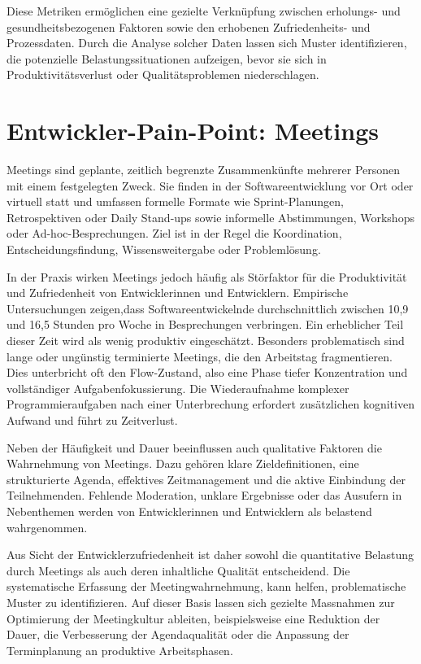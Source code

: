 \documentclass[12pt,a4paper]{report}
\begin{document}
Diese Metriken ermöglichen eine gezielte Verknüpfung zwischen erholungs- und gesundheitsbezogenen Faktoren sowie den erhobenen
Zufriedenheits- und Prozessdaten. Durch die Analyse solcher Daten lassen sich Muster identifizieren, die potenzielle
Belastungssituationen aufzeigen, bevor sie sich in Produktivitätsverlust oder Qualitätsproblemen niederschlagen. 


\section{Entwickler-Pain-Point: Meetings}

    Meetings sind geplante, zeitlich begrenzte Zusammenkünfte mehrerer Personen mit einem festgelegten Zweck. Sie finden in
    der Softwareentwicklung vor Ort oder virtuell statt und umfassen formelle Formate wie Sprint-Planungen, Retrospektiven
    oder Daily Stand-ups sowie informelle Abstimmungen, Workshops oder Ad-hoc-Besprechungen. Ziel ist in der Regel die
    Koordination, Entscheidungsfindung, Wissensweitergabe oder Problemlösung.

    In der Praxis wirken Meetings jedoch häufig als Störfaktor für die Produktivität und Zufriedenheit von Entwicklerinnen
    und Entwicklern. Empirische Untersuchungen zeigen,dass Softwareentwickelnde durchschnittlich zwischen 10,9 und 16,5
    Stunden pro Woche in Besprechungen verbringen. Ein erheblicher Teil
    dieser Zeit wird als wenig produktiv eingeschätzt. Besonders problematisch sind lange oder ungünstig terminierte Meetings,
    die den Arbeitstag fragmentieren. Dies unterbricht oft den Flow-Zustand, also eine Phase tiefer Konzentration
    und vollständiger Aufgabenfokussierung. Die Wiederaufnahme komplexer Programmieraufgaben nach einer Unterbrechung erfordert
    zusätzlichen kognitiven Aufwand und führt zu Zeitverlust. \cite{stray_understanding_2020, meyer_today_2021}

    Neben der Häufigkeit und Dauer beeinflussen auch qualitative Faktoren die Wahrnehmung von Meetings. Dazu gehören klare
    Zieldefinitionen, eine strukturierte Agenda, effektives Zeitmanagement und die aktive Einbindung der Teilnehmenden.
    Fehlende Moderation, unklare Ergebnisse oder das Ausufern in Nebenthemen werden von Entwicklerinnen und Entwicklern
    als belastend wahrgenommen.

    Aus Sicht der Entwicklerzufriedenheit ist daher sowohl die quantitative Belastung durch Meetings als auch deren
    inhaltliche Qualität entscheidend. Die systematische Erfassung der Meetingwahrnehmung, kann helfen, problematische
    Muster zu identifizieren. Auf dieser Basis lassen sich gezielte Massnahmen
    zur Optimierung der Meetingkultur ableiten, beispielsweise eine Reduktion der Dauer, die Verbesserung der Agendaqualität
    oder die Anpassung der Terminplanung an produktive Arbeitsphasen.
\end{document}
